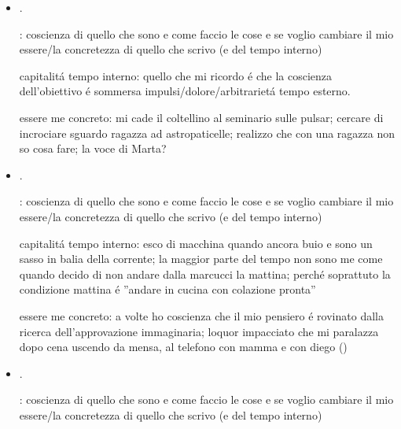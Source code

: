 \begin{itemize}
: coscienza di quello che sono e come faccio le cose e se voglio cambiare il mio essere

capitalit\'a tempo interno: essere me e problema con incontri estranei-problema condizione sonno-incosciente-malessere e di come cerco di essere me quando sono cosciente

essere me concreto: sveglia alle 7 e mi sento male: alle 8 faccio colazione e non sapendo il motivo mi alzo per fare corsa; lezione scilla: la distanza ancora del sonno: vado a lavarmi il viso-impulso rabbia

\item {}.

: coscienza di quello che sono e come faccio le cose e se voglio cambiare il mio essere/la concretezza di quello che scrivo (e del tempo interno)

capitalit\'a tempo interno: quello che mi ricordo \'e che la coscienza dell'obiettivo \'e sommersa impulsi/dolore/arbitrariet\'a tempo esterno.

essere me concreto: mi cade il coltellino al seminario sulle pulsar; cercare di incrociare sguardo ragazza ad astropaticelle; realizzo che con una ragazza non so cosa fare; la voce di Marta?

\item {}.

: coscienza di quello che sono e come faccio le cose e se voglio cambiare il mio essere/la concretezza di quello che scrivo (e del tempo interno)

capitalit\'a tempo interno: esco di macchina quando ancora buio e sono un sasso in balia della corrente; la maggior parte del tempo non sono me come quando decido di non andare dalla marcucci la mattina; perch\'e soprattuto la condizione mattina \'e ''andare in cucina con colazione pronta''

essere me concreto: a volte ho coscienza che il mio pensiero \'e rovinato dalla ricerca dell'approvazione immaginaria; loquor impacciato che mi paralazza dopo cena uscendo da mensa, al telefono con mamma e con diego ()

\item {}.

: coscienza di quello che sono e come faccio le cose e se voglio cambiare il mio essere/la concretezza di quello che scrivo (e del tempo interno)


\end{itemize}
